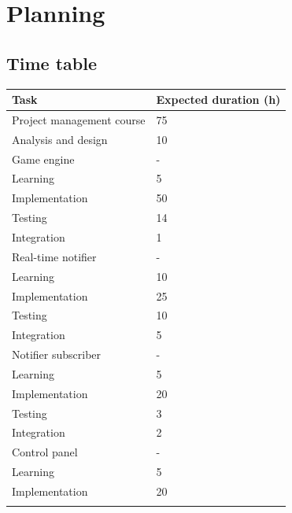 \documentclass[a4paper,11pt,titlepage,abstract,numbers=noenddot,automark,mnsy,intlimits,rgb,dvipsnames]{report}
\begin{document}
\chapter{Planning}
\section{Time table}
\label{time_table}
\begin{center}
\begin{tabular}{l | l}
\textbf{Task} & \textbf{Expected duration (h)}\\
\hline
Project management course & 75\\
\hline
Analysis and design & 10\\
\hline
Game engine & -\\
\hspace{1em}
Learning & 5\\
\hspace{1em}
Implementation & 50\\
\hspace{1em}
Testing & 14\\
\hspace{1em}
Integration & 1\\
\hline
Real-time notifier & -\\
\hspace{1em}
Learning & 10\\
\hspace{1em}
Implementation & 25\\
\hspace{1em}
Testing & 10\\
\hspace{1em}
Integration & 5\\
\hline
Notifier subscriber & -\\
\hspace{1em}
Learning & 5\\
\hspace{1em}
Implementation & 20\\
\hspace{1em}
Testing & 3\\
\hspace{1em}
Integration & 2\\
\hline
Control panel & -\\
\hspace{1em}
Learning & 5\\
\hspace{1em}
Implementation & 20\\
\hspace{1em}

\end{tabular}
\end{center}
\end{document}
